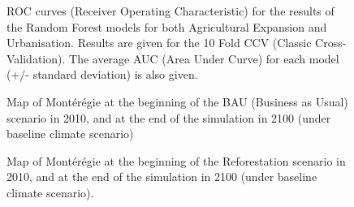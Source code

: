 \begin{figure}[h!]
 \caption[ROC Curves for re-samples for Agricultural Expansion and Urbanisation]{ROC curves (Receiver Operating Characteristic) for the results of the Random Forest models for both Agricultural Expansion and Urbanisation. Results are given for the 10 Fold CCV (Classic Cross-Validation). The average AUC (Area Under Curve) for each model (+/- standard deviation) is also given.}
 \label{fig:roc_rs}
\end{figure}


\begin{figure}[h!]
 \caption[Map of Montérégie at the beginning of the BAU scenario in 2010, and at the end in 2100 (under baseline climate scenario)]{Map of Montérégie at the beginning of the BAU (Business as Usual) scenario in 2010, and at the end of the simulation in 2100 (under baseline climate scenario)}
 \label{fig:BAU_compare}
\end{figure}

\begin{figure}[h!]
 \caption[Map of Montérégie at the beginning of the Reforestation scenario in 2010, and at the end in 2100 (under baseline climate scenario)]{Map of Montérégie at the beginning of the Reforestation scenario in 2010, and at the end of the simulation in 2100 (under baseline climate scenario).}
 \label{fig:Ref_compare}
\end{figure}

